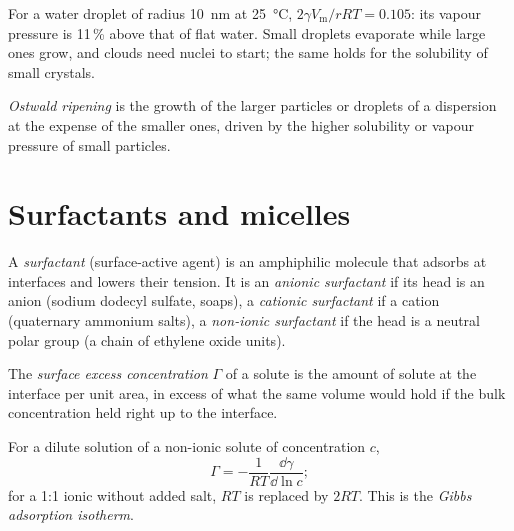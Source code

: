 For a water droplet of radius \qty{10}{nm} at \qty{25}{\celsius}, $2\gamma V_{\mathrm m}/rRT = 0.105$: its vapour
pressure is 11\,\% above that of flat water. Small droplets evaporate while
large ones grow, and clouds need nuclei to start; the same holds for the
solubility of small crystals.

\begin{definition}\label{def:b3:colloids:ripening}
\emph{Ostwald ripening} is the growth of the larger
particles or droplets of a dispersion at the expense of the smaller ones,
driven by the higher solubility or vapour pressure of small particles.
\end{definition}

\section{Surfactants and micelles}

\begin{definition}[Surfactant]\label{def:b3:colloids:surfactant}
A \emph{surfactant} (surface-active agent) is an amphiphilic
molecule that adsorbs at interfaces and lowers their tension. It is an
\emph{anionic surfactant} if its head is an anion (sodium
dodecyl sulfate, soaps), a \emph{cationic surfactant}
if a cation (quaternary ammonium salts), a \emph{non-ionic
surfactant} if the head is a neutral polar group (a
chain of ethylene oxide units).
\end{definition}

\begin{definition}\label{def:b3:colloids:surface-excess}
The \emph{surface excess concentration} $\Gamma$ of a
solute is the amount of solute at the interface per unit area, in excess of
what the same volume would hold if the bulk concentration held right up to
the interface.
\end{definition}

\begin{theorem}\label{thm:b3:colloids:gibbs-adsorption}
For a dilute solution of a non-ionic solute of concentration $c$,
\[
  \Gamma = -\frac{1}{RT}\frac{\dd\gamma}{\dd\ln c};
\]
for a 1:1 ionic  without added salt, $RT$ is replaced by $2RT$. This is
the \emph{Gibbs adsorption isotherm}.
\end{theorem}

